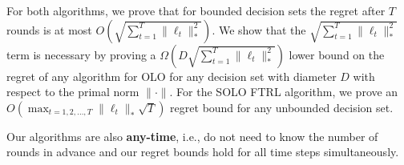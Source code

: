 For both algorithms, we prove that for bounded decision sets the regret after
$T$ rounds is at most $O(\sqrt{\sum_{t=1}^T\|\ell_t\|_*^2})$.  We show that the
$\sqrt{\sum_{t=1}^T \|\ell_t\|_*^2}$ term is necessary by proving a $\Omega (D
\sqrt{\sum_{t=1}^T\|\ell_t\|_*^2} )$ lower bound on the regret of any algorithm
for OLO for any decision set with diameter $D$ with respect to the primal norm
$\|\cdot\|$. For the \textsc{SOLO FTRL} algorithm, we prove an
$O(\max_{t=1,2,\dots,T} \|\ell_t\|_* \sqrt{T})$ regret bound for any unbounded
decision set.

Our algorithms are also \textbf{any-time}, i.e., do not need to know the
number of rounds in advance and our regret bounds hold for all time steps
simultaneously.
